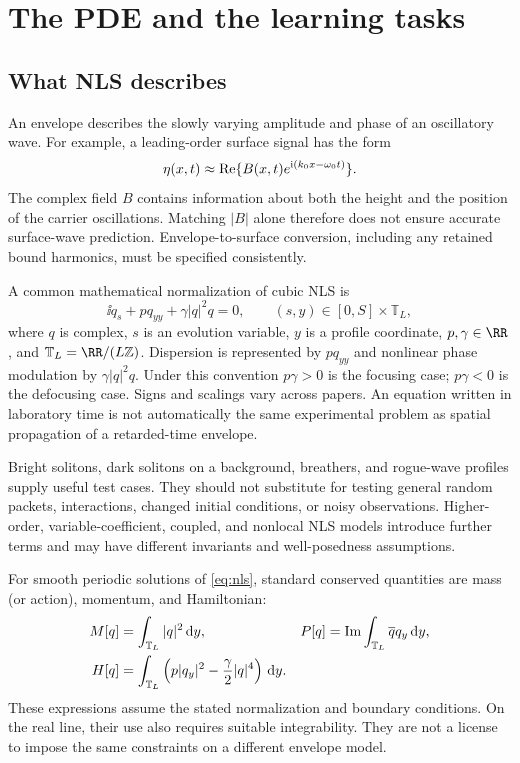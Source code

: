 \section{The PDE and the learning tasks}
\label{sec:math}
\subsection{What NLS describes}
An envelope describes the slowly varying amplitude and phase of an
oscillatory wave. For example, a leading-order surface signal has the form
\[
 \eta(x,t)\approx\operatorname{Re}\{B(x,t)e^{\mathrm{i}(k_0x-\omega_0t)}\}.
\]
The complex field $B$ contains information about both the height and the
position of the carrier oscillations. Matching $|B|$ alone therefore does
not ensure accurate surface-wave prediction. Envelope-to-surface conversion,
including any retained bound harmonics, must be specified consistently.

A common mathematical normalization of cubic NLS is
\begin{equation}
 \ii q_s+p q_{yy}+\gamma |q|^2q=0,
 \qquad (s,y)\in[0,S]\times\mathbb T_L,
 \label{eq:nls}
\end{equation}
where $q$ is complex, $s$ is an evolution variable, $y$ is a profile
coordinate, $p,\gamma\in\RR$, and $\mathbb T_L=\RR/(L\mathbb Z)$.
Dispersion is represented by $p q_{yy}$ and nonlinear phase modulation by
$\gamma|q|^2q$. Under this convention $p\gamma>0$ is the focusing case;
$p\gamma<0$ is the defocusing case. Signs and scalings vary across papers.
An equation written in laboratory time is not automatically the same
experimental problem as spatial propagation of a retarded-time envelope.

Bright solitons, dark solitons on a background, breathers, and rogue-wave
profiles supply useful test cases. They should not substitute for testing
general random packets, interactions, changed initial conditions, or noisy
observations. Higher-order, variable-coefficient, coupled, and nonlocal NLS
models introduce further terms and may have different invariants and
well-posedness assumptions.

For smooth periodic solutions of \eqref{eq:nls}, standard conserved
quantities are mass (or action), momentum, and Hamiltonian:
\begin{align}
 M[q]&=\int_{\mathbb T_L}|q|^2\,\mathrm{d} y,&
 P[q]&=\operatorname{Im}\int_{\mathbb T_L}\overline q q_y\,\mathrm{d} y,\notag\\
 H[q]&=\int_{\mathbb T_L}
       \left(p|q_y|^2-\frac{\gamma}{2}|q|^4\right)\,\mathrm{d} y.
 \label{eq:nlsinvariants}
\end{align}
These expressions assume the stated normalization and boundary conditions.
On the real line, their use also requires suitable integrability. They are
not a license to impose the same constraints on a different envelope model.

